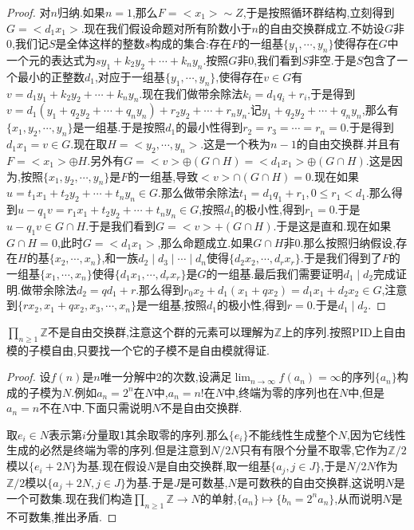 \begin{enumerate}
\begin{proof}
		对$n$归纳.如果$n=1$,那么$F=<x_1>\sim Z$,于是按照循环群结构,立刻得到$G=<d_1x_1>$.现在我们假设命题对所有阶数小于$n$的自由交换群成立.不妨设$G$非0,我们记$S$是全体这样的整数$s$构成的集合:存在$F$的一组基$\{y_1,\cdots,y_n\}$使得存在$G$中一个元的表达式为$sy_1+k_2y_2+\cdots+k_ny_n$.按照$G$非0,我们看到$S$非空.于是$S$包含了一个最小的正整数$d_1$,对应于一组基$\{y_1,\cdots,y_n\}$,使得存在$v\in G$有$v=d_1y_1+k_2y_2+\cdots+k_ny_n$.现在我们做带余除法$k_i=d_1q_i+r_i$,于是得到$v=d_1(y_1+q_2y_2+\cdots+q_ny_n)+r_2y_2+\cdots+r_ny_n$.记$y_1+q_2y_2+\cdots+q_ny_n$,那么有$\{x_1,y_2,\cdots,y_n\}$是一组基.于是按照$d_1$的最小性得到$r_2=r_3=\cdots=r_n=0$.于是得到$d_1x_1=v\in G$.现在取$H=<y_2,\cdots,y_n>$.这是一个秩为$n-1$的自由交换群.并且有$F=<x_1>\oplus H$.另外有$G=<v>\oplus(G\cap H)=<d_1x_1>\oplus(G\cap H)$.这是因为,按照$\{x_1,y_2,\cdots,y_n\}$是$F$的一组基,导致$<v>\cap(G\cap H)=0$.现在如果$u=t_1x_1+t_2y_2+\cdots+t_ny_n\in G$.那么做带余除法$t_1=d_1q_1+r_1,0\le r_1<d_1$.那么得到$u-q_1v=r_1x_1+t_2y_2+\cdots+t_ny_n\in G$,按照$d_1$的极小性,得到$r_1=0$.于是$u-q_1v\in G\cap H$.于是我们看到$G=<v>+(G\cap H)$.于是这是直和.现在如果$G\cap H=0$,此时$G=<d_1x_1>$,那么命题成立.如果$G\cap H$非0.那么按照归纳假设,存在$H$的基$\{x_2,\cdots,x_n\}$,和一族$d_2\mid d_3\mid\cdots\mid d_n$使得$\{d_2x_2,\cdots,d_rx_r\}$.于是我们得到了$F$的一组基$\{x_1,\cdots,x_n\}$使得$\{d_1x_1,\cdots,d_rx_r\}$是$G$的一组基.最后我们需要证明$d_1\mid d_2$完成证明.做带余除法$d_2=qd_1+r$.那么得到$r_0x_2+d_1(x_1+qx_2)=d_1x_1+d_2x_2\in G$,注意到$\{rx_2,x_1+qx_2,x_3,\cdots,x_n\}$是一组基,按照$d_1$的极小性,得到$r=0$.于是$d_1\mid d_2$.
	\end{proof}
\end{enumerate}

$\prod_{n\ge1}\mathbb{Z}$不是自由交换群,注意这个群的元素可以理解为$\mathbb{Z}$上的序列.按照PID上自由模的子模自由,只要找一个它的子模不是自由模就得证.
\begin{proof}

设$f(n)$是$n$唯一分解中2的次数,设满足$\lim_{n\to\infty}f(a_n)=\infty$的序列$\{a_n\}$构成的子模为$N$.例如$a_n=2^n$在$N$中,$a_n=n!$在$N$中,终端为零的序列也在$N$中,但是$a_n=n$不在$N$中.下面只需说明$N$不是自由交换群.

取$e_i\in N$表示第$i$分量取1其余取零的序列.那么$\{e_i\}$不能线性生成整个$N$,因为它线性生成的必然是终端为零的序列.但是注意到$N/2N$只有有限个分量不取零,它作为$\mathbb{Z}/2$模以$\{e_i+2N\}$为基.现在假设$N$是自由交换群,取一组基$\{a_j,j\in J\}$,于是$N/2N$作为$\mathbb{Z}/2$模以$\{a_j+2N,j\in J\}$为基.于是$J$是可数基,$N$是可数秩的自由交换群,这说明$N$是一个可数集.现在我们构造$\prod_{n\ge1}\mathbb{Z}\to N$的单射,$\{a_n\}\mapsto\{b_n=2^na_n\}$,从而说明$N$是不可数集,推出矛盾.
\end{proof}
\newpage
